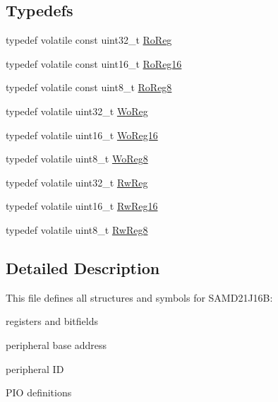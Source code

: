 \subsection*{Typedefs}
\begin{DoxyCompactItemize}
\item 
typedef volatile const uint32\+\_\+t \mbox{\hyperlink{group___s_a_m_d21_j16_b__definitions_ga5d556f8391af4141be23f7334ac9dd68}{Ro\+Reg}}
\item 
typedef volatile const uint16\+\_\+t \mbox{\hyperlink{group___s_a_m_d21_j16_b__definitions_gaebf6e33c2d49a802e06e22a95ea9d0d0}{Ro\+Reg16}}
\item 
typedef volatile const uint8\+\_\+t \mbox{\hyperlink{group___s_a_m_d21_j16_b__definitions_ga0d957f1433aaf5d70e4dc2b68288442d}{Ro\+Reg8}}
\item 
typedef volatile uint32\+\_\+t \mbox{\hyperlink{group___s_a_m_d21_j16_b__definitions_gac0f96d4e8018367b38f527007cf0eafd}{Wo\+Reg}}
\item 
typedef volatile uint16\+\_\+t \mbox{\hyperlink{group___s_a_m_d21_j16_b__definitions_ga0ab0e5f6c8301aa1c2068e511d854094}{Wo\+Reg16}}
\item 
typedef volatile uint8\+\_\+t \mbox{\hyperlink{group___s_a_m_d21_j16_b__definitions_ga5e336e5a36ee12ebeafb021108e5275b}{Wo\+Reg8}}
\item 
typedef volatile uint32\+\_\+t \mbox{\hyperlink{group___s_a_m_d21_j16_b__definitions_gacf1496e3bbe303e55f627fc7558a68c7}{Rw\+Reg}}
\item 
typedef volatile uint16\+\_\+t \mbox{\hyperlink{group___s_a_m_d21_j16_b__definitions_gacce07556c80fc352ae607f225f19fed5}{Rw\+Reg16}}
\item 
typedef volatile uint8\+\_\+t \mbox{\hyperlink{group___s_a_m_d21_j16_b__definitions_gae361754be775bb192f85821d3ab33c17}{Rw\+Reg8}}
\end{DoxyCompactItemize}


\subsection{Detailed Description}
This file defines all structures and symbols for S\+A\+M\+D21\+J16B\+:
\begin{DoxyItemize}
\item registers and bitfields
\item peripheral base address
\item peripheral ID
\item P\+IO definitions 
\end{DoxyItemize}

